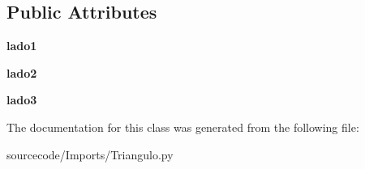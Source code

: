 \subsection*{Public Attributes}
\begin{DoxyCompactItemize}
\item 
\mbox{\label{class_imports_1_1_triangulo_1_1_triangulo_a88d5d8832e37e9543881a7370d28dc81}} 
{\bfseries lado1}
\item 
\mbox{\label{class_imports_1_1_triangulo_1_1_triangulo_abb9022ca4d70bbc86fadd202e4479d96}} 
{\bfseries lado2}
\item 
\mbox{\label{class_imports_1_1_triangulo_1_1_triangulo_a27922fe444d0737e0b99bacb1970760a}} 
{\bfseries lado3}
\end{DoxyCompactItemize}


The documentation for this class was generated from the following file\+:\begin{DoxyCompactItemize}
\item 
sourcecode/\+Imports/Triangulo.\+py\end{DoxyCompactItemize}
